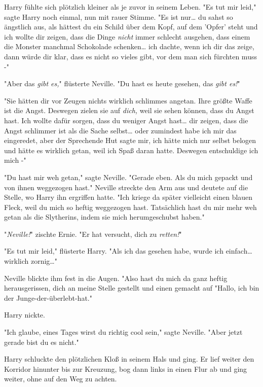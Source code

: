 {Harry fühlte sich plötzlich kleiner als je zuvor in seinem Leben. "Es tut mir leid," sagte Harry noch einmal, nun mit rauer Stimme. "Es ist nur… du sahst so ängstlich aus, als hättest du ein Schild über dem Kopf, auf dem 'Opfer' steht und ich wollte dir zeigen, dass die Dinge \emph{nicht} immer schlecht ausgehen, dass einem die Monster manchmal Schokolade schenken… ich dachte, wenn ich dir das zeige, dann würde dir klar, dass es nicht so vieles gibt, vor dem man sich fürchten muss -"

"Aber das \emph{gibt es,}" flüsterte Neville. "Du hast es heute gesehen, das \emph{gibt es!}"

"Sie hätten dir vor Zeugen nichts wirklich schlimmes angetan. Ihre größte Waffe ist die Angst. Deswegen zielen sie auf \emph{dich,} weil sie sehen können, dass du Angst hast. Ich wollte dafür sorgen, dass du weniger Angst hast… dir zeigen, dass die Angst schlimmer ist als die Sache selbst… oder zumindest habe ich mir das eingeredet, aber der Sprechende Hut sagte mir, ich hätte mich nur selbst belogen und hätte es wirklich getan, weil ich Spaß daran hatte. Deswegen entschuldige ich mich -"

"Du hast mir weh getan," sagte Neville. "Gerade eben. Als du mich gepackt und von ihnen weggezogen hast." Neville streckte den Arm aus und deutete auf die Stelle, wo Harry ihn ergriffen hatte. "Ich kriege da später vielleicht einen blauen Fleck, weil du mich so heftig weggezogen hast. Tatsächlich hast du mir mehr weh getan als die Slytherins, indem sie mich herumgeschubst haben."

"\emph{Neville!}" zischte Ernie. "Er hat versucht, dich zu \emph{retten!}"

"Es tut mir leid," flüsterte Harry. "Als ich das gesehen habe, wurde ich einfach… wirklich zornig…"

Neville blickte ihm fest in die Augen. "Also hast du mich da ganz heftig herausgerissen, dich an meine Stelle gestellt und einen gemacht auf "Hallo, ich bin der Junge-der-überlebt-hat."

Harry nickte.

"Ich glaube, eines Tages wirst du richtig cool sein," sagte Neville. "Aber jetzt gerade bist du es nicht."

Harry schluckte den plötzlichen Kloß in seinem Hals und ging. Er lief weiter den Korridor hinunter bis zur Kreuzung, bog dann links in einen Flur ab und ging weiter, ohne auf den Weg zu achten.

}
